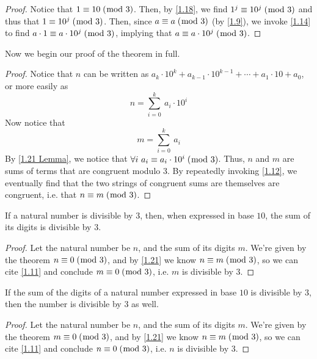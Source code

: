 \documentclass[../main.tex]{subfiles}
\begin{document}
\begin{proof}
Notice that $1 \equiv 10 \; (\bmod \; 3)$. Then, by \ref{1.18}, we find $1^j \equiv 10^j \; (\bmod \; 3)$ and thus that $1 \equiv 10^j \; (\bmod \; 3)$. Then, since $a \equiv a \; (\bmod \; 3)$ (by \ref{1.9}), we invoke \ref{1.14} to find $a \cdot 1 \equiv a \cdot 10^j \; (\bmod \; 3)$, implying that $a \equiv a \cdot 10^j \; (\bmod \; 3)$.
\end{proof}

Now we begin our proof of the theorem in full.

\begin{proof}
Notice that $n$ can be written as $a_k \cdot 10^k + a_{k-1} \cdot 10^{k-1} + \cdots + a_1 \cdot 10 + a_0$, or more easily as $$n = \sum_{i=0}^k \  a_i \cdot 10^i$$
Now notice that $$m = \sum_{i=0}^k \  a_i$$
By \ref{1.21 Lemma}, we notice that $\forall i \  a_i \equiv a_i \cdot 10^i \; (\bmod \; 3)$. Thus, $n$ and $m$ are sums of terms that are congruent modulo $3$. By repeatedly invoking \ref{1.12}, we eventually find that the two strings of congruent sums are themselves are congruent, i.e. that $n \equiv m \; (\bmod \; 3)$.
\end{proof}



\begin{thm} \label{1.22}
If a natural number is divisible by $3$, then, when expressed in base $10$, the sum of its digits is divisible by $3$.
\end{thm}

\begin{proof}
Let the natural number be $n$, and the sum of its digits $m$. We're given by the theorem $n \equiv 0 \; (\bmod \; 3)$, and by \ref{1.21} we know $n \equiv m \; (\bmod \; 3)$, so we can cite \ref{1.11} and conclude $m \equiv 0 \; (\bmod \; 3)$, i.e. $m$ is divisible by $3$.
\end{proof}



\pagebreak



\begin{thm} \label{1.23}
If the sum of the digits of a natural number expressed in base $10$ is divisible by $3$, then the number is divisible by $3$ as well.
\end{thm}

\begin{proof}
Let the natural number be $n$, and the sum of its digits $m$. We're given by the theorem $m \equiv 0 \; (\bmod \; 3)$, and by \ref{1.21} we know $n \equiv m \; (\bmod \; 3)$, so we can cite \ref{1.11} and conclude $n \equiv 0 \; (\bmod \; 3)$, i.e. $n$ is divisible by $3$.
\end{proof}
\end{document}
